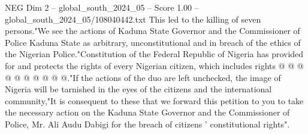 \begin{textsample}{NEG Dim 2 – global\_south\_2024\_05 – Score 1.00 – global\_south\_2024\_05/108040442.txt}
This led to the killing of seven persons."We see the actions of Kaduna State Governor and the Commissioner of Police Kaduna State as arbitrary, unconstitutional and in breach of the ethics of the Nigerian Police."Constitution of the Federal Republic of Nigeria has provided for and protects the rights of every Nigerian citizen, which includes rights @ @ @ @ @ @ @ @ @ @."If the actions of the duo are left unchecked, the image of Nigeria will be tarnished in the eyes of the citizens and the international community,"It is consequent to these that we forward this petition to you to take the necessary action on the Kaduna State Governor and the Commissioner of Police, Mr.
Ali Audu Dabigi for the breach of citizens ' constitutional rights".

\end{textsample}

